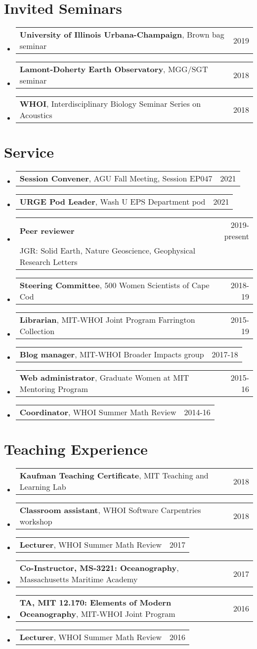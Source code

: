 \documentclass[letterpaper,11pt]{article}
\makeatletter
\newcommand{\resumeField}[3]{
  \vspace{-2pt}\item
    \begin{tabular*}{0.97\textwidth}[t]{l@{\extracolsep{\fill}}r}
      \textbf{#1} & #2 \\
      \small#3\\
    \end{tabular*}\vspace{-7pt}
}
\newcommand{\resumeSmallThing}[3]{
  \vspace{-2pt}\item
    \begin{tabular*}{0.97\textwidth}[t]{l@{\extracolsep{\fill}}r}
      \textbf{#1}, {#2} & #3\\
    \end{tabular*}\vspace{-14pt}
}
\newcommand{\resumeSubHeadingListStart}{\begin{itemize}[leftmargin=0.15in, label={}]}
\newcommand{\resumeSubHeadingListEnd}{\end{itemize}}
\makeatother
\begin{document}
\section{Invited Seminars}
    \resumeSubHeadingListStart
    \resumeSmallThing
      {University of Illinois Urbana-Champaign}{Brown bag seminar}{2019}
    \resumeSmallThing
      {Lamont-Doherty Earth Observatory}{MGG/SGT seminar}{2018}
    \resumeSmallThing
      {WHOI}{Interdisciplinary Biology Seminar Series on Acoustics}{2018}
    \resumeSubHeadingListEnd


\section{Service}
    \resumeSubHeadingListStart
    \resumeSmallThing
      {Session Convener}{AGU Fall Meeting, Session EP047}{2021}
    \resumeSmallThing
      {URGE Pod Leader}{Wash U EPS Department pod}{2021}
    \resumeField
      {Peer reviewer}{2019-present}
      {JGR: Solid Earth, Nature Geoscience, Geophysical Research Letters}
    \resumeSmallThing
      {Steering Committee}{500 Women Scientists of Cape Cod}{2018-19}
    \resumeSmallThing
      {Librarian}{MIT-WHOI Joint Program Farrington Collection}{2015-19}
    \resumeSmallThing
      {Blog manager}{MIT-WHOI Broader Impacts group}{2017-18}
    \resumeSmallThing
      {Web administrator}{Graduate Women at MIT Mentoring Program}{2015-16}
    \resumeSmallThing
      {Coordinator}{WHOI Summer Math Review}{2014-16}
    \resumeSubHeadingListEnd


\section{Teaching Experience}
  \resumeSubHeadingListStart
    \resumeSmallThing
      {Kaufman Teaching Certificate}{MIT Teaching and Learning Lab}{2018}
    \resumeSmallThing
      {Classroom assistant}{WHOI Software Carpentries workshop}{2018}
    \resumeSmallThing
      {Lecturer}{WHOI Summer Math Review}{2017}
    \resumeSmallThing
      {Co-Instructor, MS-3221: Oceanography}{Massachusetts Maritime Academy}{2017}
    \resumeSmallThing
      {TA, MIT 12.170: Elements of Modern Oceanography}{MIT-WHOI Joint Program}{2016}
    \resumeSmallThing
      {Lecturer}{WHOI Summer Math Review}{2016}
  \resumeSubHeadingListEnd


\end{document}
